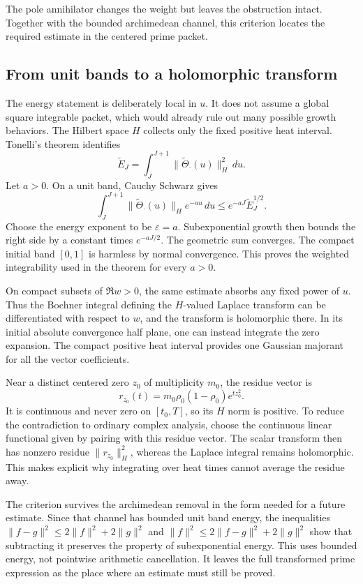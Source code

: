 The pole annihilator changes the weight but leaves the obstruction intact. Together with the bounded archimedean channel, this criterion locates the required estimate in the centered prime packet.

\subsection{From unit bands to a holomorphic transform}

The energy statement is deliberately local in \(u\). It does not assume a global square integrable packet, which would already rule out many possible growth behaviors. The Hilbert space \(H\) collects only the fixed positive heat interval. Tonelli's theorem identifies
\[
\widetilde E_J=\int_J^{J+1}
\|\widetilde\Theta_\cdot(u)\|_H^2\,du.
\]
Let \(a>0\). On a unit band, Cauchy Schwarz gives
\[
\int_J^{J+1}\|\widetilde\Theta_\cdot(u)\|_H e^{-au}\,du
\le e^{-aJ}\widetilde E_J^{1/2}.
\]
Choose the energy exponent to be \(\varepsilon=a\). Subexponential growth then bounds the right side by a constant times \(e^{-aJ/2}\). The geometric sum converges. The compact initial band \([0,1]\) is harmless by normal convergence. This proves the weighted integrability used in the theorem for every \(a>0\).

On compact subsets of \(\Re w>0\), the same estimate absorbs any fixed power of \(u\). Thus the Bochner integral defining the \(H\)-valued Laplace transform can be differentiated with respect to \(w\), and the transform is holomorphic there. In its initial absolute convergence half plane, one can instead integrate the zero expansion. The compact positive heat interval provides one Gaussian majorant for all the vector coefficients.

Near a distinct centered zero \(z_0\) of multiplicity \(m_0\), the residue vector is
\[
r_{z_0}(t)=m_0\rho_0(1-\rho_0)e^{tz_0^2}.
\]
It is continuous and never zero on \([t_0,T]\), so its \(H\) norm is positive. To reduce the contradiction to ordinary complex analysis, choose the continuous linear functional given by pairing with this residue vector. The scalar transform then has nonzero residue \(\|r_{z_0}\|_H^2\), whereas the Laplace integral remains holomorphic. This makes explicit why integrating over heat times cannot average the residue away.

The criterion survives the archimedean removal in the form needed for a future estimate. Since that channel has bounded unit band energy, the inequalities
\(\|f-g\|^2\le2\|f\|^2+2\|g\|^2\) and
\(\|f\|^2\le2\|f-g\|^2+2\|g\|^2\)
show that subtracting it preserves the property of subexponential energy. This uses bounded energy, not pointwise arithmetic cancellation. It leaves the full transformed prime expression as the place where an estimate must still be proved.

